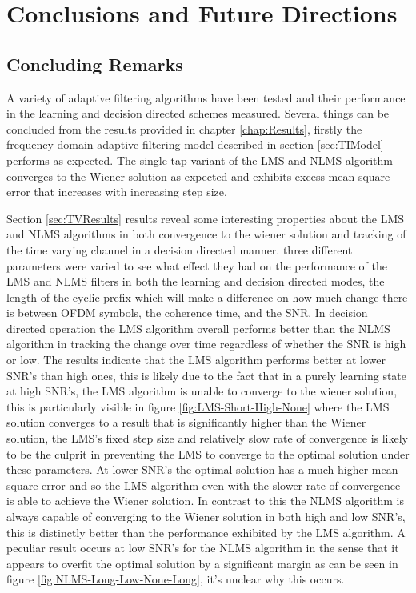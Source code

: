 \chapter{Conclusions and Future Directions}

\section{Concluding Remarks}

A variety of adaptive filtering algorithms have been tested %
and their performance in the learning and decision directed %
schemes measured. Several things can be concluded from the %
results provided in chapter \ref{chap:Results}, firstly the %
frequency domain adaptive filtering model described in section %
\ref{sec:TIModel} performs as expected. The single tap %
variant of the LMS and NLMS algorithm converges to the %
Wiener solution as expected and exhibits excess mean square error %
that increases with increasing step size. 

Section \ref{sec:TVResults} %
results reveal some interesting properties about the LMS and %
NLMS algorithms in both convergence to the wiener solution and tracking %
of the time varying channel in a decision directed manner. three different %
parameters were varied to see what effect they had on the performance %
of the LMS and NLMS filters in both the learning and decision directed modes, %
the length of the cyclic prefix which will make a difference on how much change %
there is between OFDM symbols, the coherence time, and the SNR. In %
decision directed operation the LMS algorithm overall performs better than %
the NLMS algorithm in tracking the change over time regardless of whether %
the SNR is high or low. The results indicate that the LMS algorithm performs better %
at lower SNR's than high ones, this is likely due to the fact that in a purely %
learning state at high SNR's, the LMS algorithm is unable to converge to the %
wiener solution, this is particularly visible in figure \ref{fig:LMS-Short-High-None} where %
the LMS solution converges to a result that is significantly higher than the %
Wiener solution, the LMS's fixed step size and relatively slow rate of convergence %
is likely to be the culprit in preventing the LMS to converge to the optimal %
solution under these parameters. At lower SNR's the optimal solution has a %
much higher mean square error and so the LMS algorithm even with the slower %
rate of convergence is able to achieve the Wiener solution. %
In contrast to this the NLMS algorithm is always capable of converging to the %
Wiener solution in both high and low SNR's, this is distinctly better than %
the performance exhibited by the LMS algorithm. A peculiar result occurs at %
low SNR's for the NLMS algorithm in the sense that it appears to overfit the %
optimal solution by a significant margin as can be seen in figure %
\ref{fig:NLMS-Long-Low-None-Long}, it's unclear why this occurs. %

